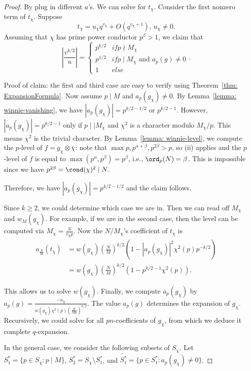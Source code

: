 \documentclass [11pt, proquest] {uwthesis}[2015/03/03]
\begin{document}
\begin{proof}
By plug in different $a$'s. We can solve for $t_\chi$.  Consider the first nonzero term of $t_\chi$. Suppose 
\[
	t_\chi = u_\chi q^{v_\chi} + O(q^{v_\chi + 1}), \, u_\chi \neq 0.
\]
Assuming that $\chi$ has prime power conductor $p^\beta > 1$, we claim that 
$$\left| \frac{v^{k/2}}{u} \right| = \begin{cases} p^{k/2} & if p \nmid M_\chi \\ p^{1/2} & if p \mid M_\chi \mbox{ and }  a_p(g) \neq 0 \\ 1 & else \end{cases}.$$

Proof of claim: the first and third case are easy to verify using Theorem~\ref{thm: ExpansionFormula}. Now assume $p \mid M$ and $a_p(g_\chi) \neq 0$. By Lemma~\ref{lemma: winnie-vanishing}, we have $|a_p(g_\chi)| = p^{k/2 - 1/2}$ or $p^{k/2 - 1}$. However, $|a_p(g_\chi)| = p^{k/2-1}$ only if $p \mid \mid M_\chi$ and $\chi^2$ is a character modulo $M_\chi/p$. This means $\chi^2$ is the trivial character. By Lemma~\ref{lemma: winnie-level}, we compute the $p$-level of $f = g_\chi \otimes \bar{\chi}$: note that $\max{p, p^{\alpha+\beta}, p^{2\beta}} > p$, so (ii) applies and the $p$-level of $f$ is equal to $\max(p^{\alpha}, p^{\beta})  = p^{\beta}$, i.e., $\ord_p(N) = \beta$. This is impossible since we have $p^{2 \beta} = \cond(\chi)^2 \mid N$. 

Therefore, we have $|a_p(g_\chi)| = p^{k/2-1/2}$ and the claim follows.

Since $k \geq 2$, we could determine which case we are in. Then we can read off $M_\chi$  and $w_M(g_\chi)$. For example, if we are in the second case, then the level can be computed via $M_\chi = \frac{N}{v_\chi p}$.  Now  the $N/M_\chi$'s coefficient of $t_\chi$ is 
\begin{eqnarray*}
	a_{\frac{N}{M}}(t_\chi) &= w(g_\chi) (\frac{N}{M})^{k/2} ( 1 -  |a_p(g_\chi)|^2 \chi^2(p) p^{-k/2} )  \\
	& = w(g_\chi) (\frac{N}{M})^{k/2} ( 1 - p^{k/2 -1} \chi^2(p)). 
\end{eqnarray*}

This allows us to solve $w(g_\chi)$. Finally, we compute $a_p(g_\chi)$ by $a_p(g) = \frac{-u_\chi}{w(g_\chi) \chi^2(p) (\frac{N}{Mp})^{k/2}}$. The value $a_p(g)$ determines the expansion of $g_\chi$. Recursively, we could solve for all $pn$-coefficients of $g_\chi$, from which we deduce it complete $q$-expansion. 


In the general case,  we consider the following subsets of $S_\chi$.  Let $S_1^* = \{ p \in S_\chi: p \mid M \}$, $S_2^* = 
S_\chi \setminus S_1^*$, and $\widetilde{S_1^*}= \{p \in S_1^*: a_p(g_\chi) \neq 0\}$.


\end{proof}
\end{document}

